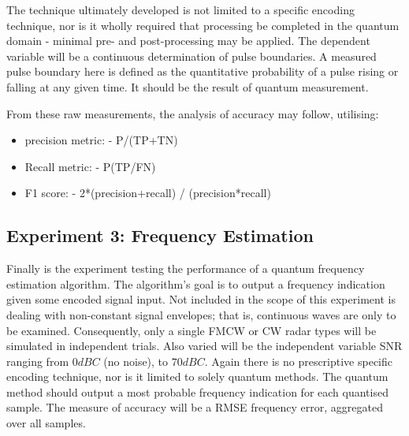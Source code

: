 The technique ultimately developed is not limited to a specific encoding technique, nor is it wholly required that processing be completed in the quantum domain - minimal pre- and post-processing may be applied.
The dependent variable will be a continuous determination of pulse boundaries.
A measured pulse boundary here is defined as the quantitative probability of a pulse rising or falling at any given time.
It should be the result of quantum measurement.

From these raw measurements, the analysis of accuracy may follow, utilising:
\begin{itemize}
    \item precision metric:
-  P/(TP+TN)
    \item Recall metric:
-  P(TP/FN)
    \item F1 score:
-  2*(precision+recall) / (precision*recall)
\end{itemize}


\subsection{Experiment 3: Frequency Estimation}

Finally is the experiment testing the performance of a quantum frequency estimation algorithm.
The algorithm's goal is to output a frequency indication given some encoded signal input.
Not included in the scope of this experiment is dealing with non-constant signal envelopes; that is, continuous waves are only to be examined.
Consequently, only a single \ac{FMCW} or \ac{CW} radar types will be simulated in independent trials.
Also varied will be the independent variable \ac{SNR} ranging from $0dBC$ (no noise), to $70dBC$.
Again there is no prescriptive specific encoding technique, nor is it limited to solely quantum
methods.
The quantum method should output a most probable frequency indication for each quantised sample.
The measure of accuracy will be a \ac{RMSE} frequency error, aggregated over all samples. 

